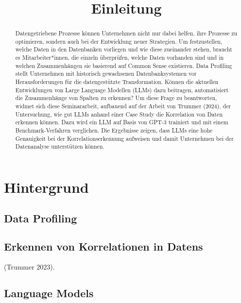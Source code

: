 \documentclass[
  11pt,
]{report}
\title{Einleitung}
\author{}
\date{}
\renewcommand*\contentsname{Table of contents}
\newcommand\contentsname{Table of contents}
\begin{document}
\maketitle
\begin{abstract}
Datengetriebene Prozesse können Unternehmen nicht nur dabei helfen, ihre
Prozesse zu optimieren, sondern auch bei der Entwicklung neuer
Strategien. Um festzustellen, welche Daten in den Datenbanken vorliegen
und wie diese zueinander stehen, braucht es Mitarbeiter*innen, die
einzeln überprüfen, welche Daten vorhanden sind und in welchen
Zusammenhängen sie basierend auf Common Sense existieren. Data Profiling
stellt Unternehmen mit historisch gewachsenen Datenbanksystemen vor
Herausforderungen für die datengestützte Transformation. Können die
aktuellen Entwicklungen von Large Language Modellen (LLMs) dazu
beitragen, automatisiert die Zusammenhänge von Spalten zu erkennen? Um
diese Frage zu beantworten, widmet sich diese Seminararbeit, aufbauend
auf der Arbeit von Trummer (2024), der Untersuchung, wie gut LLMs anhand
einer Case Study die Korrelation von Daten erkennen können. Dazu wird
ein LLM auf Basis von GPT-3 trainiert und mit einem Benchmark-Verfahren
verglichen. Die Ergebnisse zeigen, dass LLMs eine hohe Genauigkeit bei
der Korrelationserkennung aufweisen und damit Unternehmen bei der
Datenanalyse unterstützen können.
\end{abstract}

\renewcommand*\contentsname{Table of contents}
{
\hypersetup{linkcolor=}
\setcounter{tocdepth}{2}
\tableofcontents
}
\listoffigures
\listoftables
{}
\chapter{Hintergrund}\label{hintergrund}

\section{Data Profiling}\label{data-profiling}

\section{Erkennen von Korrelationen in
Datens}\label{erkennen-von-korrelationen-in-datens}

(Trummer 2023).

\section{Language Models}\label{language-models}
\end{document}
